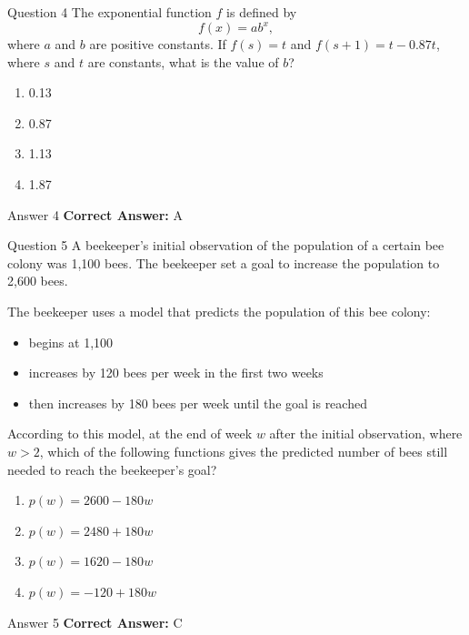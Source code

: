 \documentclass{beamer}
\begin{document}
\begin{frame}{Question 4}
\small
The exponential function \(f\) is defined by
\[
f(x) = ab^x,
\]
where \(a\) and \(b\) are positive constants.
If \(f(s) = t\) and \(f(s + 1) = t - 0.87t\), where \(s\) and \(t\) are constants, what is the value of \(b\)?
\vspace{0.35cm}
\begin{enumerate}
    \item[A.] 0.13
    \item[B.] 0.87
    \item[C.] 1.13
    \item[D.] 1.87
\end{enumerate}
\end{frame}
\begin{frame}{Answer 4}
\small
\textbf{Correct Answer:} A
\end{frame}

\begin{frame}{Question 5}
\small
A beekeeper's initial observation of the population of a certain bee colony was 1,100 bees.
The beekeeper set a goal to increase the population to 2,600 bees.

The beekeeper uses a model that predicts the population of this bee colony:

\begin{itemize}
\item begins at 1,100
\item increases by 120 bees per week in the first two weeks
\item then increases by 180 bees per week until the goal is reached
\end{itemize}

According to this model, at the end of week \(w\) after the initial observation, where \(w > 2\),
which of the following functions gives the predicted number of bees still needed to reach the beekeeper's goal?
\vspace{0.35cm}
\begin{enumerate}
    \item[A.] \(p(w) = 2600 - 180w\)
    \item[B.] \(p(w) = 2480 + 180w\)
    \item[C.] \(p(w) = 1620 - 180w\)
    \item[D.] \(p(w) = -120 + 180w\)
\end{enumerate}
\end{frame}
\begin{frame}{Answer 5}
\small
\textbf{Correct Answer:} C
\end{frame}
\end{document}
